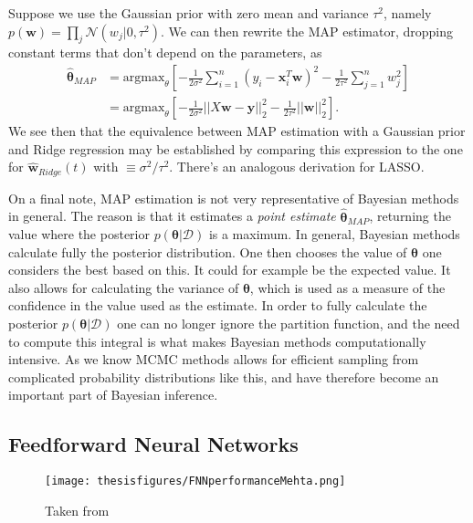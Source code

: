 \documentclass[twoside,english]{uiofysmaster}
\begin{document}
Suppose we use the Gaussian prior with zero mean and variance $\tau^2$, namely $p(\bm{w}) = \prod_j \mathcal{N}(w_j | 0, \tau^2)$. We can then rewrite the MAP estimator, dropping constant terms that don't depend on the parameters, as
\begin{align}
	\hat{\bm{\theta}}_{MAP} &= \text{argmax}_\theta [- \frac{1}{2\sigma^2} \sum_{i=1}^n (y_i - \bm{x}_i^T \bm{w})^2 -\frac{1}{2\tau^2} \sum_{j=1}^n w_j^2  ] \\ 
	&= \text{argmax}_\theta [- \frac{1}{2\sigma^2} ||X \bm{w} - \bm{y}||_2^2 -\frac{1}{2\tau^2} ||\bm{w}||_2^2  ].
\end{align}
We see then that the equivalence between MAP estimation with a Gaussian prior and Ridge regression may be established by comparing this expression to the one for $\hat{\bm{w}}_{Ridge} (t)$ with $\equiv \sigma^2 / \tau^2 $. There's an analogous derivation for LASSO.

On a final note, MAP estimation is not very representative of Bayesian methods in general. The reason is that it estimates a \textit{point estimate} $\hat{\bm{\theta}}_{MAP}$, returning the value where the posterior $p(\bm{\theta}|\mathcal{D})$ is a maximum. In general, Bayesian methods calculate fully the posterior distribution. One then chooses the value of $\bm{\theta}$ one considers the best based on this. It could for example be the expected value. It also allows for calculating the variance of $\bm{\theta}$, which is used as a measure of the confidence in the value used as the estimate. In order to fully calculate the posterior $p(\bm{\theta}|\mathcal{D})$ one can no longer ignore the partition function, and the need to compute this integral is what makes Bayesian methods computationally intensive. As we know MCMC methods allows for efficient sampling from complicated probability distributions like this, and have therefore become an important part of Bayesian inference.


\subsection{Feedforward Neural Networks}
\label{sec:FNN}

\begin{figure}
\centering
 \texttt{[image: thesisfigures/FNNperformanceMehta.png]}
 \caption{Taken from \cite{Mehta2018}}
 \label{fig:FNNperformanceMehta}
\end{figure}
\end{document}
